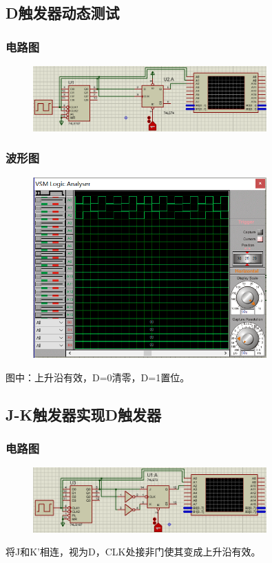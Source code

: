 \documentclass[UTF8, a4paper, 11pt]{article}
\begin{document}
\subsection{D触发器动态测试}
\subsubsection{电路图}
\begin{figure}[H]
    \centering
    \includegraphics[width=0.8\textwidth]{ex9.2电路图.png}
\end{figure}
\subsubsection{波形图}
\begin{figure}[H]
    \centering
    \includegraphics[width=0.8\textwidth]{ex9.2波形图.png}
\end{figure}
图中：上升沿有效，D=0清零，D=1置位。
\subsection{J-K触发器实现D触发器}
\subsubsection{电路图}
\begin{figure}[H]
    \centering
    \includegraphics[width=0.8\textwidth]{ex9.3电路图.png}
\end{figure}
将J和K'相连，视为D，CLK处接非门使其变成上升沿有效。
\end{document}
